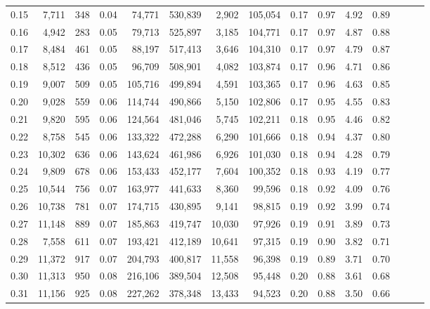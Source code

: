 \begin{tabular}{rrrrrrrrrrrrrrr}
0.15 &   7,711 &    348 &  0.04 &   74,771 &  530,839 &    2,902 &  105,054 &  0.17 &  0.97 &  4.92 &      0.89 \\
0.16 &   4,942 &    283 &  0.05 &   79,713 &  525,897 &    3,185 &  104,771 &  0.17 &  0.97 &  4.87 &      0.88 \\
0.17 &   8,484 &    461 &  0.05 &   88,197 &  517,413 &    3,646 &  104,310 &  0.17 &  0.97 &  4.79 &      0.87 \\
0.18 &   8,512 &    436 &  0.05 &   96,709 &  508,901 &    4,082 &  103,874 &  0.17 &  0.96 &  4.71 &      0.86 \\
0.19 &   9,007 &    509 &  0.05 &  105,716 &  499,894 &    4,591 &  103,365 &  0.17 &  0.96 &  4.63 &      0.85 \\
0.20 &   9,028 &    559 &  0.06 &  114,744 &  490,866 &    5,150 &  102,806 &  0.17 &  0.95 &  4.55 &      0.83 \\
0.21 &   9,820 &    595 &  0.06 &  124,564 &  481,046 &    5,745 &  102,211 &  0.18 &  0.95 &  4.46 &      0.82 \\
0.22 &   8,758 &    545 &  0.06 &  133,322 &  472,288 &    6,290 &  101,666 &  0.18 &  0.94 &  4.37 &      0.80 \\
0.23 &  10,302 &    636 &  0.06 &  143,624 &  461,986 &    6,926 &  101,030 &  0.18 &  0.94 &  4.28 &      0.79 \\
0.24 &   9,809 &    678 &  0.06 &  153,433 &  452,177 &    7,604 &  100,352 &  0.18 &  0.93 &  4.19 &      0.77 \\
0.25 &  10,544 &    756 &  0.07 &  163,977 &  441,633 &    8,360 &   99,596 &  0.18 &  0.92 &  4.09 &      0.76 \\
0.26 &  10,738 &    781 &  0.07 &  174,715 &  430,895 &    9,141 &   98,815 &  0.19 &  0.92 &  3.99 &      0.74 \\
0.27 &  11,148 &    889 &  0.07 &  185,863 &  419,747 &   10,030 &   97,926 &  0.19 &  0.91 &  3.89 &      0.73 \\
0.28 &   7,558 &    611 &  0.07 &  193,421 &  412,189 &   10,641 &   97,315 &  0.19 &  0.90 &  3.82 &      0.71 \\
0.29 &  11,372 &    917 &  0.07 &  204,793 &  400,817 &   11,558 &   96,398 &  0.19 &  0.89 &  3.71 &      0.70 \\
0.30 &  11,313 &    950 &  0.08 &  216,106 &  389,504 &   12,508 &   95,448 &  0.20 &  0.88 &  3.61 &      0.68 \\
0.31 &  11,156 &    925 &  0.08 &  227,262 &  378,348 &   13,433 &   94,523 &  0.20 &  0.88 &  3.50 &      0.66 \\

\end{tabular}
